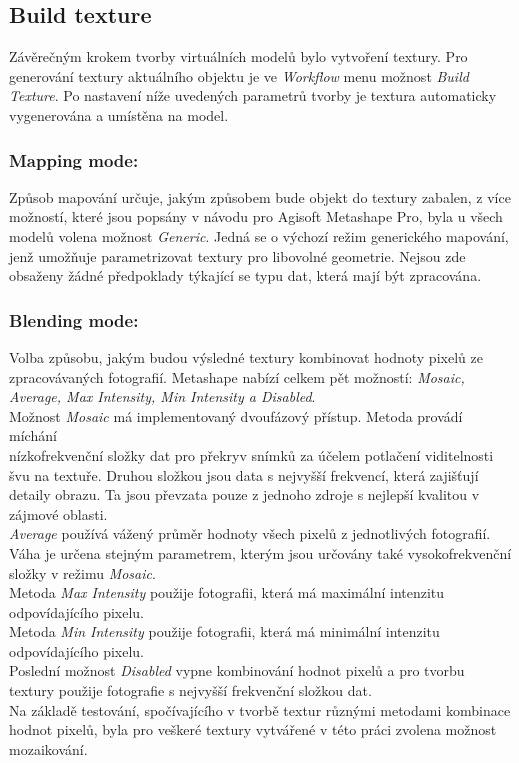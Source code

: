 \documentclass[a4paper, 12pt]{report}
\begin{document}
\subsection{Build texture}
Závěrečným krokem tvorby virtuálních modelů bylo vytvoření textury. Pro generování textury aktuálního objektu je ve \textit{Workflow} menu možnost \textit{Build Texture}. Po nastavení níže uvedených parametrů tvorby je textura automaticky vygenerována a umístěna na model. 

\subsubsection*{Mapping mode:}
Způsob mapování určuje, jakým způsobem bude objekt do textury zabalen, z více možností, které jsou popsány v návodu pro Agisoft Metashape Pro, byla u všech modelů volena možnost \textit{Generic}. Jedná se o výchozí režim generického mapování, jenž umožňuje parametrizovat textury pro libovolné geometrie. Nejsou zde obsaženy žádné předpoklady týkající se typu dat, která mají být zpracována. 

\subsubsection*{Blending mode:}
Volba způsobu, jakým budou výsledné textury kombinovat hodnoty pixelů ze zpracovávaných fotografií. Metashape nabízí celkem pět možností: \textit{Mosaic, Average, Max Intensity, Min Intensity a Disabled}.\\
Možnost \textit{Mosaic} má implementovaný dvoufázový přístup. Metoda provádí míchání \\nízkofrekvenční složky dat pro překryv snímků za účelem potlačení viditelnosti švu na textuře. Druhou složkou jsou data s nejvyšší frekvencí, která zajišťují detaily obrazu. Ta jsou převzata pouze z jednoho zdroje s nejlepší kvalitou v zájmové oblasti. \\
\textit{Average} používá vážený průměr hodnoty všech pixelů z jednotlivých fotografií. Váha je určena stejným parametrem, kterým jsou určovány také vysokofrekvenční složky v režimu \textit{Mosaic}. \\
Metoda \textit{Max Intensity} použije fotografii, která má maximální intenzitu odpovídajícího pixelu.\\
Metoda \textit{Min Intensity} použije fotografii, která má minimální intenzitu odpovídajícího pixelu.\\
Poslední možnost \textit{Disabled} vypne kombinování hodnot pixelů a pro tvorbu textury použije fotografie s nejvyšší frekvenční složkou dat. \\
Na základě testování, spočívajícího v tvorbě textur různými metodami kombinace hodnot pixelů, byla pro veškeré textury vytvářené v této práci zvolena možnost mozaikování.
\end{document}
